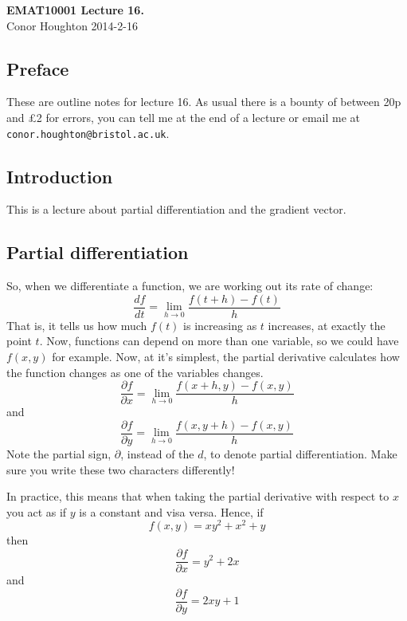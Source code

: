 \documentclass[12pt]{article}
\begin{document}
\begin{center}
{\bf EMAT10001 Lecture 16.}\\[1cm]{} Conor Houghton 2014-2-16
\end{center}
\subsection*{Preface} 
These are outline notes for lecture 16. As usual there is a bounty of
between 20p and \pounds 2 for errors, you can tell me at the end of a
lecture or email me at \texttt{conor.houghton{@}bristol.ac.uk}.

\subsection*{Introduction}

This is a lecture about partial differentiation and the gradient
vector.

\subsection*{Partial differentiation}

So, when we differentiate a function, we are working out its rate of change:
\begin{equation}
\frac{df}{dt}=\lim_{h\rightarrow 0}\frac{f(t+h)-f(t)}{h}
\end{equation}
That is, it tells us how much $f(t)$ is increasing as $t$ increases,
at exactly the point $t$. Now, functions can depend on more than one
variable, so we could have $f(x,y)$ for example. Now, at it's
simplest, the partial derivative calculates how the function changes as one
of the variables changes.
\begin{equation}
\frac{\partial f}{\partial x}=\lim_{h\rightarrow 0}\frac{f(x+h,y)-f(x,y)}{h}
\end{equation}
and
\begin{equation}
\frac{\partial f}{\partial y}=\lim_{h\rightarrow 0}\frac{f(x,y+h)-f(x,y)}{h}
\end{equation}
Note the partial sign, $\partial$, instead of the $d$, to denote
partial differentiation. Make sure you write these two characters
differently!

In practice, this means that when taking the partial derivative with
respect to $x$ you act as if $y$ is a constant and visa versa. Hence, if
\begin{equation}
f(x,y)=xy^2+x^2+y
\end{equation}
then
\begin{equation}
\frac{\partial f}{\partial x}=y^2+2x
\end{equation}
and 
\begin{equation}
\frac{\partial f}{\partial y}=2xy+1
\end{equation}
\end{document}
